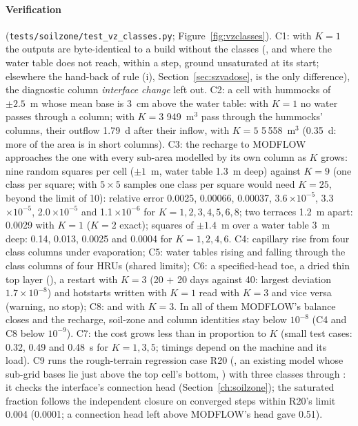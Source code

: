 \paragraph{Verification} (\texttt{tests/soilzone/test\_vz\_classes.py}; Figure~\ref{fig:vzclasses}). C1: with $K=1$
the outputs are byte-identical to a build without the classes (, and  where the water table does
not reach, within a step, ground unsaturated at its start; elsewhere the hand-back of rule (i), Section~\ref{sec:szvadose},
is the only difference), the diagnostic column \emph{interface change} left out. C2: a cell with hummocks of $\pm2.5$~m
whose mean base is 3~cm above the water table: with $K=1$ no water passes through a column; with $K=3$ 949~m$^3$ pass
through the hummocks' columns, their outflow 1.79~d after their inflow, with $K=5$ 5\,558~m$^3$ (0.35~d: more of the
area is in short columns). C3: the recharge to MODFLOW approaches the one with every sub-area modelled by its own column
as $K$ grows: nine random squares per cell ($\pm1$~m, water table 1.3~m deep) against $K=9$ (one class per square; with
$5\times5$ samples one class per square would need $K=25$, beyond the limit of 10): relative error 0.0025, 0.00066,
0.00037, 3.6\,$\times10^{-5}$, 3.3\,$\times10^{-5}$, 2.0\,$\times10^{-5}$ and 1.1\,$\times10^{-6}$ for $K=1,2,3,4,5,6,8$;
two terraces 1.2~m apart: 0.0029 with $K=1$ ($K=2$ exact); squares of $\pm1.4$~m over a water table 3~m deep: 0.14,
0.013, 0.0025 and 0.0004 for $K=1,2,4,6$. C4: capillary rise from four class columns under evaporation; C5: water tables
rising and falling through the class columns of four HRUs (shared limits); C6: a specified-head toe, a dried thin top
layer (), a restart with $K=3$ (20 + 20 days against 40: largest deviation $1.7\times10^{-8}$) and hotstarts
written with $K=1$ read with $K=3$ and vice versa (warning, no stop); C8:  and  with $K=3$. In all
of them MODFLOW's balance closes and the recharge, soil-zone and column identities stay below $10^{-8}$ (C4 and C8 below
$10^{-9}$). C7: the cost grows less than in proportion to $K$ (small test cases: 0.32, 0.49 and 0.48~s for $K=1,3,5$;
timings depend on the machine and its load). C9 runs the rough-terrain regression case R20 (, an existing
model whose sub-grid bases lie just above the top cell's bottom, ) with three classes through
: it checks the interface's connection head (Section~\ref{ch:soilzone}); the saturated
fraction follows the independent closure on converged steps within R20's limit 0.004 (0.0001; a connection head left above
MODFLOW's head gave 0.51).

